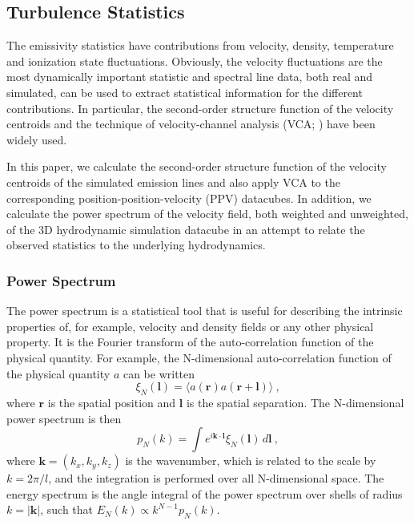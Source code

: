 \documentclass[useAMS,usenatbib]{mn2e}
\begin{document}
\subsection{Turbulence Statistics}
\label{subsec:turbstats}
The emissivity statistics have contributions from velocity, density,
temperature and ionization state fluctuations. Obviously, the velocity
fluctuations are the most dynamically important statistic and spectral
line data, both real and simulated, can be used to extract statistical
information for the different contributions. In particular, the
second-order structure function of the velocity centroids and the
technique of velocity-channel analysis (VCA; \citealp{2000ApJ...537..720L}) have been widely used.

In this paper, we calculate the second-order structure function
of the velocity centroids of the simulated emission lines and also apply
VCA to the corresponding position-position-velocity (PPV)
datacubes. In addition, we calculate the power spectrum of the velocity field,
both weighted and unweighted, of the 3D hydrodynamic simulation
datacube in an attempt to relate the observed statistics to the
underlying hydrodynamics.

\subsubsection{Power Spectrum}

The power spectrum is a statistical tool that is useful for describing
the intrinsic properties of, for example, velocity and density fields
or any other physical property. It is the Fourier
transform of the auto-correlation function of the physical
quantity. For example, the N-dimensional auto-correlation function of the
physical quantity $a$ can be written
\begin{equation}
  \xi_N(\boldsymbol{l}) = \langle
  a(\mathbf{r})a(\mathbf{r}+\boldsymbol{l})\rangle \ ,
\label{eq:corrfn}
\end{equation}
where $\mathbf{r}$ is the spatial position and $\boldsymbol{l}$ is the
spatial separation. The N-dimensional power spectrum is then
\begin{equation}
  p_N(k) = \int e^{i\mathbf{k}\cdot\boldsymbol{l}} \xi_N({\boldsymbol{l}}) \,
  d\boldsymbol{l} \ ,
\end{equation}
where $\mathbf{k}  = (k_x,k_y,k_z)$ is the wavenumber, which is related to the scale by
$k = 2\pi/l$, and the integration is performed over all N-dimensional
space. The energy spectrum is the angle integral of
the power spectrum over shells of radius $k = |\mathbf{k} |$, such that $E_N(k) \propto k^{N-1} p_N(k)$.
\end{document}
